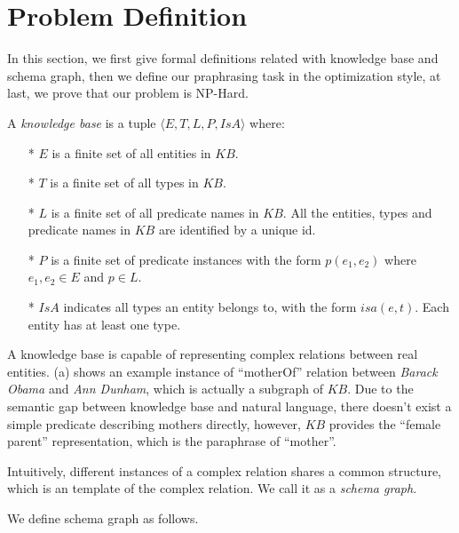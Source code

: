 \section{Problem Definition}
\label{sec:problem}

In this section, we first give formal definitions related with knowledge base
and schema graph, then we define our praphrasing task in the optimization style,
at last, we prove that our problem is NP-Hard.

\begin{defn}
A {\em knowledge base} is a tuple $\langle E, T, L, P, IsA \rangle$ where:
\begin{itemize}
  \item[*] $E$ is a finite set of all entities in $KB$.
  \item[*] $T$ is a finite set of all types in $KB$.
  \item[*] $L$ is a finite set of all predicate names in $KB$.
  All the entities, types and predicate names in $KB$ are identified by a unique id.
  \item[*] $P$ is a finite set of predicate instances with the form
  $p(e_1, e_2)$ where $e_1, e_2 \in E$ and $p \in L$.
  \item[*] $IsA$ indicates all types an entity belongs to, with the form $isa(e, t)$.
  Each entity has at least one type.
\end{itemize}
\end{defn}


A knowledge base is capable of representing complex relations between real entities.
(a) shows an example instance of ``motherOf'' relation between
\textit{Barack Obama} and \textit{Ann Dunham}, which is actually a subgraph of $KB$.
Due to the semantic gap between knowledge base and natural language, there doesn't
exist a simple predicate describing mothers directly, however, $KB$ provides the
 ``female parent'' representation, which is the paraphrase of ``mother''.

Intuitively, different instances of a complex relation shares a common structure,
which is an template of the complex relation. We call it as a \textit{schema graph}.

We define schema graph as follows.

